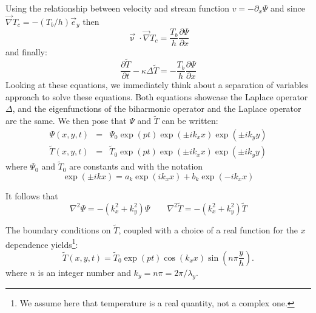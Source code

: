 Using the relationship between velocity and stream function
$v=-\partial_x \Psi$
and since $\vec\nabla T_c = - (T_b/h) \vec{e}_y$ then
\[
{\vec \upnu}\cdot {\vec \nabla} T_c =  \frac{T_b}{h}   \frac{\partial \Psi}{\partial x} 
\]
and finally:
\begin{equation}
\boxed{
\frac{\partial \tilde{T}}{\partial t} - \kappa \Delta \tilde{T} 
= -  \frac{T_b}{h}   \frac{\partial \Psi}{\partial x}
}
\end{equation}
Looking at these equations, we immediately think about a separation of variables approach to solve these
equations. Both equations showcase the Laplace operator $\Delta$, and the eigenfunctions of the biharmonic operator and the Laplace operator are the same. 
We then pose that $\Psi$ and $\tilde{T}$ can be written:
\begin{eqnarray}
\Psi(x,y,t) &=& \Psi_0 \exp(pt)\exp(\pm i k_x x) \exp(\pm i k_y y) \\ %
\tilde{T}(x,y,t) &=& \tilde{T}_0 \exp(pt) \exp(\pm i k_x x) \exp(\pm i k_y y) %
\end{eqnarray}
where $\Psi_0$ and $\tilde{T}_0$ are constants and with the notation
\[
\exp (\pm i k x) = a_k \exp (i k_x x) + b_k \exp (-i k_x x )
\]

It follows that
\[
\nabla^2 \Psi = -(k_x^2+k_y^2) \Psi
\quad\quad
\nabla^2 \tilde{T} = -(k_x^2+k_y^2) \tilde{T}
\]

The boundary conditions on $\tilde{T}$, 
coupled with a choice of a real function for the $x$ dependence 
yields\footnote{We assume here that temperature is a real quantity, not a complex one.}:
\[
\tilde{T}(x,y,t) = \tilde{T}_0 \exp(pt) \cos (k_x x) \sin \left(n\pi \frac{y}{h} \right).
\]
where $n$ is an integer number and $k_y=n \pi = 2 \pi/ \lambda_y$. 

